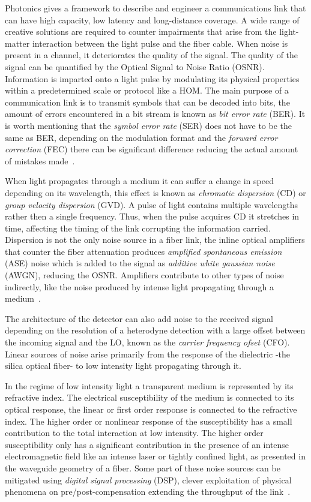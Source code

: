 Photonics gives a framework to describe and engineer a communications link that can have high capacity, low latency and long-distance coverage. A wide range of creative solutions are required to counter impairments that arise from the light-matter interaction between the light pulse and the fiber cable. When noise is present in a channel, it deteriorates the quality of the signal. The quality of the signal can be quantified  by the Optical Signal to Noise Ratio (OSNR). Information is imparted onto a light pulse by modulating its physical properties within a predetermined scale or protocol like a HOM. The main purpose of a communication link is to transmit symbols that can be decoded into bits, the amount of errors encountered in a bit stream is known as \textit{bit error rate} (BER). It is worth mentioning that the \textit{symbol error rate} (SER) does not have to be the same as BER, depending on the modulation format and the \textit{forward error correction} (FEC) there can be significant difference reducing the actual amount of mistakes made~\cite{benedetto1999principles}. 


When light propagates through a medium it can suffer a change in speed depending on its wavelength, this effect is known as \textit{chromatic dispersion} (CD) or \textit{group velocity dispersion} (GVD). A pulse of light contains multiple wavelengths  rather then a single frequency. Thus, when the pulse acquires CD it stretches in time, affecting the timing of the link corrupting the information carried.  Dispersion is not the only noise source in a fiber link, the inline optical amplifiers that counter the fiber attenuation produces \textit{amplified spontaneous emission} (ASE) noise which is added to the signal as \textit{additive white gaussian noise} (AWGN), reducing the OSNR. Amplifiers contribute to other types of noise indirectly, like the noise produced by intense light propagating through a medium~\cite{FiberAgrawal}.

The architecture of the detector can also add noise  to the received signal depending on the resolution of a heterodyne detection with a large offset between the incoming signal and the LO, known as the \textit{carrier frequency ofset} (CFO). Linear sources of noise arise primarily from the response of the dielectric -the silica optical fiber- to low intensity light propagating through it. 

In the regime of low intensity light a transparent medium is represented by its refractive index. The electrical susceptibility of the medium is connected to its optical response, the linear or first order response is connected to the refractive index. The higher order or nonlinear response of the susceptibility has a small contribution to the total interaction at low intensity. The higher order susceptibility only has a significant contribution in the presence of an intense electromagnetic field like an intense laser or tightly confined light, as presented in the waveguide geometry of a fiber. Some part of these noise sources can be mitigated using \textit{digital signal processing} (DSP), clever exploitation of physical phenomena on pre/post-compensation extending the throughput of the link~\cite{agrawalapplications}.     
      



